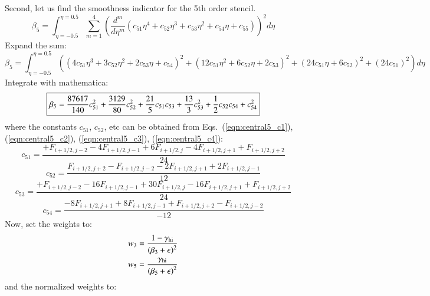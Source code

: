 \documentclass{warpdoc}
\newcommand\frameeqn[1]{\fbox{$\displaystyle #1$}}
\begin{document}
Second, let us find the smoothness indicator for the 5th order stencil. 
%
\begin{equation}
\beta_5 =   \int_{\eta=-0.5}^{\eta=0.5} \sum_{m=1}^4 \left(  \frac{d^m }{d\eta^m}\left(c_{51} \eta^4 + c_{52} \eta^3 + c_{53} \eta^2 + c_{54} \eta + c_{55} 
\right) \right)^2 d\eta
\end{equation}
%
Expand the sum:
%
\begin{equation}
\beta_5 =   \int_{\eta=-0.5}^{\eta=0.5}  \left(  \left(4 c_{51} \eta^3 + 3 c_{52} \eta^2 + 2 c_{53} \eta + c_{54}  
\right)^2 + \left(12 c_{51} \eta^2 + 6 c_{52} \eta + 2 c_{53}   
\right)^2 + \left(24 c_{51} \eta + 6 c_{52} \right)^2 + \left(24 c_{51}  \right)^2 \right) d\eta
\end{equation}
%
Integrate with mathematica:
%
\begin{equation}
\frameeqn{
\beta_5 =   \frac{87617}{140}c_{51}^2+ \frac{3129}{80}c_{52}^2 + \frac{21}{5}c_{51} c_{53} + \frac{13}{3} c_{53}^2 + \frac{1}{2}c_{52} c_{54} + c_{54}^2
}
\end{equation}
%
where the constants $c_{51}$, $c_{52}$, etc can be obtained from Eqs.\ (\ref{eqn:central5_c1}), (\ref{eqn:central5_c2}), (\ref{eqn:central5_c3}), (\ref{eqn:central5_c4}):
%
\begin{equation}
 c_{51}= \frac{+F_{i+1/2,j-2} -4 F_{i+1/2,j-1}+ 6 F_{i+1/2,j} -4 F_{i+1/2,j+1} +F_{i+1/2,j+2}}{24}   
\end{equation}
% 
%
\begin{equation}
c_{52}=\frac{F_{i+1/2,j+2}-F_{i+1/2,j-2}-2F_{i+1/2,j+1}+2F_{i+1/2,j-1}}{12}    
\end{equation}
% 
%
\begin{equation}
c_{53}=\frac{+ F_{i+1/2,j-2} -16 F_{i+1/2,j-1}+ 30 F_{i+1/2,j} -16 F_{i+1/2,j+1} 
+F_{i+1/2,j+2}}{24}   
\end{equation}
% 
%
\begin{equation}
c_{54}=\frac{-8F_{i+1/2,j+1}+8F_{i+1/2,j-1}+F_{i+1/2,j+2}-F_{i+1/2,j-2}}{-12}  
\end{equation}
% 
Now, set the weights to:
%
\begin{align}
w_3&=\frac{1-\gamma_{\rm hi}}{ \left( \beta_3 + \epsilon \right)^2} \\
w_5&=\frac{\gamma_{\rm hi}}{ \left( \beta_5 + \epsilon \right)^2}
\end{align}
%
and the normalized weights to:
\end{document}
